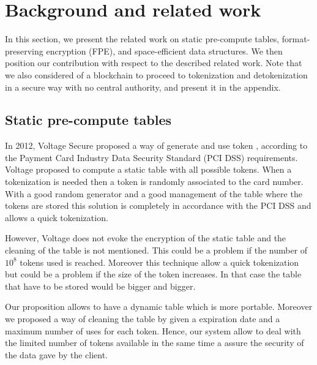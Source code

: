 \documentclass{llncs}
\newcounter{prob}
\begin{document}
\section{Background and related work}\label{sect:background}

In this section, we present the related work on static pre-compute tables, format-preserving encryption (FPE), and space-efficient data structures. We then position our contribution with respect to the described related work. Note that we also considered of a blockchain to proceed to tokenization and detokenization in a secure way with no central authority, and present it in the appendix.

\subsection{Static pre-compute tables}

In 2012, Voltage Secure proposed a way of generate and use token \cite{Voltage}, according to the Payment Card Industry Data Security Standard (PCI DSS) requirements. Voltage proposed to compute a static table with all possible tokens. When a tokenization is needed then a token is randomly associated to the card number. With a good random generator and a good management of the table where the tokens are stored this solution is completely in accordance with the PCI DSS and allows a quick tokenization. 
\par However, Voltage does not evoke the encryption of the static table and the cleaning of the table is not mentioned. This could be a problem if the number of $10^8$ tokens used is reached. Moreover this technique allow a quick tokenization but could be a problem if the size of the token increases. In that case the table that have to be stored would be bigger and bigger.
\par Our proposition allows to have a dynamic table which is more portable. Moreover we proposed a way of cleaning the table by given a expiration date and a maximum number of uses for each token. Hence, our system allow to deal with the limited number of tokens available in the same time a assure the security of the data gave by the client.
\end{document}
